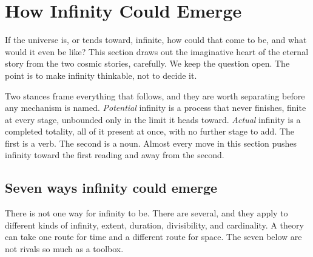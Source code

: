 \section{How Infinity Could Emerge}

If the universe is, or tends toward, infinite, how could that come to be, and what would it even be like? This section draws out the imaginative heart of the eternal story from the two cosmic stories, carefully. We keep the question open. The point is to make infinity thinkable, not to decide it.

Two stances frame everything that follows, and they are worth separating before any mechanism is named. \emph{Potential} infinity is a process that never finishes, finite at every stage, unbounded only in the limit it heads toward. \emph{Actual} infinity is a completed totality, all of it present at once, with no further stage to add. The first is a verb. The second is a noun. Almost every move in this section pushes infinity toward the first reading and away from the second.

\subsection{Seven ways infinity could emerge}

There is not one way for infinity to be. There are several, and they apply to different kinds of infinity, extent, duration, divisibility, and cardinality. A theory can take one route for time and a different route for space. The seven below are not rivals so much as a toolbox.

